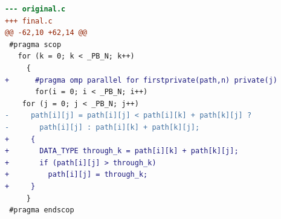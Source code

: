 \begin{lstlisting}[language=diff,basicstyle=\ttfamily\scriptsize,breaklines=true,caption={polybench/floyd-warshall — FASTER (e1_r_b)}]
--- original.c
+++ final.c
@@ -62,10 +62,14 @@
 #pragma scop
   for (k = 0; k < _PB_N; k++)
     {
+      #pragma omp parallel for firstprivate(path,n) private(j) 
       for(i = 0; i < _PB_N; i++)
 	for (j = 0; j < _PB_N; j++)
-	  path[i][j] = path[i][j] < path[i][k] + path[k][j] ?
-	    path[i][j] : path[i][k] + path[k][j];
+	  {
+	    DATA_TYPE through_k = path[i][k] + path[k][j];
+	    if (path[i][j] > through_k)
+	      path[i][j] = through_k;
+	  }
     }
 #pragma endscop
 
\end{lstlisting}
